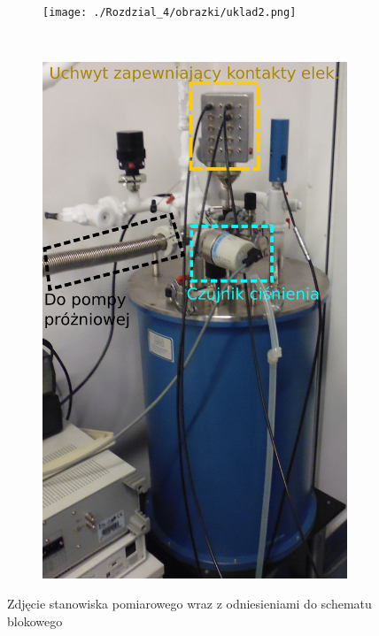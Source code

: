 \begin{figure}[ht]
        \centering
        \begin{subfigure}[b]{0.7\textwidth}
              \centering
	\texttt{[image: ./Rozdzial\_4/obrazki/uklad2.png]}
	\label{fig:ukladzdjecie}
        \end{subfigure}%
        ~ %
        \begin{subfigure}[b]{0.31\textwidth}
              \centering
	\includegraphics[width=1\textwidth]{./Rozdzial_4/obrazki/kriostat.png}
	\label{fig:ukladkriostat}
        \end{subfigure}
	\caption{Zdjęcie stanowiska pomiarowego wraz z odniesieniami do schematu blokowego}
\end{figure}

